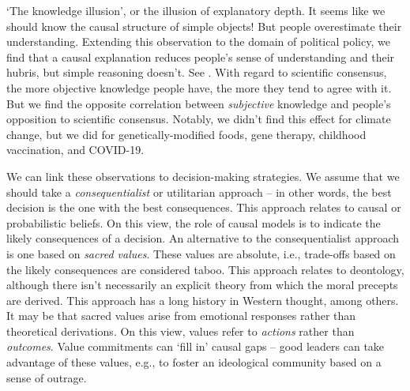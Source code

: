 `The knowledge illusion', or the illusion of explanatory depth.
It seems like we should know the causal structure of simple objects!
But people overestimate their understanding.
Extending this observation to the domain of political policy, we find that a causal
explanation reduces people's sense of understanding and their hubris, but simple
reasoning doesn't.
See \textcites{Rozenblit2002}{Fernbach2013}.
With regard to scientific consensus, the more objective knowledge people have, the more
they tend to agree with it.
But we find the opposite correlation between \emph{subjective} knowledge and people's
opposition to scientific consensus.
Notably, we didn't find this effect for climate change, but we did for
genetically-modified foods, gene therapy, childhood vaccination, and COVID-19.

We can link these observations to decision-making strategies.
We assume that we should take a \emph{consequentialist} or utilitarian approach -- in
other words, the best decision is the one with the best consequences.
This approach relates to causal or probabilistic beliefs.
On this view, the role of causal models is to indicate the likely consequences of a
decision.
An alternative to the consequentialist approach is one based on \emph{sacred values}.
These values are absolute, i.e., trade-offs based on the likely consequences are
considered taboo.
This approach relates to deontology, although there isn't necessarily an explicit
theory from which the moral precepts are derived.
This approach has a long history in Western thought, among others.
It may be that sacred values arise from emotional responses rather than theoretical
derivations.
On this view, values refer to \emph{actions} rather than \emph{outcomes}.
Value commitments can `fill in' causal gaps -- good leaders can take advantage of these
values, e.g., to foster an ideological community based on a sense of outrage.

